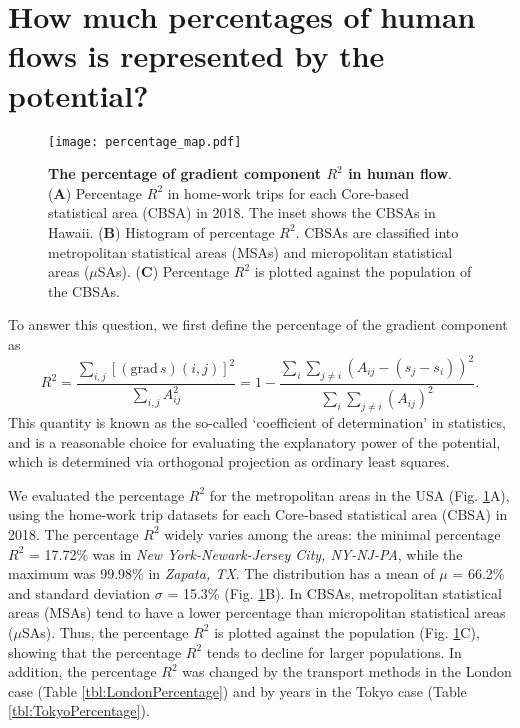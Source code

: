 \documentclass[]{article}
\begin{document}
\section*{How much percentages of human flows is represented by the potential?}
\begin{figure}[tbp]
  \texttt{[image: percentage\_map.pdf]}
  \caption{
  \textbf{The percentage of gradient component $R^2$ in human flow}.
    (\textbf{A}) Percentage $R^2$ in home-work trips for each Core-based statistical area (CBSA) in 2018. The inset shows the CBSAs in Hawaii.
    (\textbf{B}) Histogram of percentage $R^2$. CBSAs are classified into metropolitan statistical areas (MSAs) and micropolitan statistical areas ($\mu$SAs).
    (\textbf{C}) Percentage $R^2$ is plotted against the population of the CBSAs.
  }
  \label{fig:Percentage}
\end{figure}

To answer this question, we first define the percentage of the gradient component as
\begin{equation}
  R^2  =\frac{\sum_{i,j} \left[ (\text{grad}\, s)(i, j) \right]^2}{\sum_{i,j} A_{ij}^2} = 1 -  \frac{ \sum_{i} \sum_{j \neq i}  \left( A_{ij} - (s_j - s_i) \right)^2 }{\sum_{i} \sum_{j \neq i}  \left( A_{ij} \right)^2 }.
\end{equation}
This quantity is known as the so-called `coefficient of determination' in statistics, and 
is a reasonable choice for evaluating the explanatory power of the potential,
which is determined via orthogonal projection as ordinary least squares.


We evaluated the percentage $R^2$ for the metropolitan areas in the USA (Fig. \ref{fig:Percentage}A),
using the home-work trip datasets for each Core-based statistical area (CBSA) in 2018.
The percentage $R^2$ widely varies among the areas:
the minimal percentage $R^2$ = 17.72\% was in \textit{New York-Newark-Jersey City, NY-NJ-PA}, while the maximum was 99.98\% in \textit{Zapata, TX}. 
The distribution  has a mean of $\mu$ = 66.2\% and  standard deviation $\sigma$ = 15.3\% (Fig. \ref{fig:Percentage}B).
In CBSAs, metropolitan statistical areas (MSAs) tend to have a lower percentage than micropolitan statistical areas ($\mu$SAs).
Thus, the percentage $R^2$ is plotted against the population (Fig. \ref{fig:Percentage}C), showing that the percentage $R^2$ tends to decline for larger populations.
In addition, the percentage $R^2$ was changed by the transport methods in the London case (Table \ref{tbl:LondonPercentage}) and  by years in the Tokyo case (Table \ref{tbl:TokyoPercentage}).
%
\end{document}
